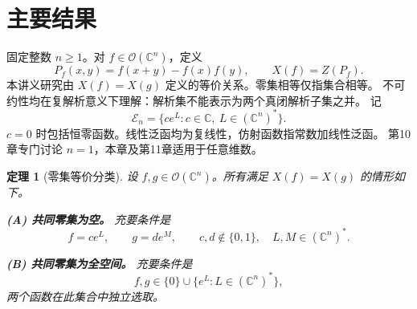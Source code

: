 \documentclass[11pt,a4paper,oneside,openany]{book}
\theoremstyle{lecture}
\newtheorem{theorem}{定理}[section]
\newcommand{\C}{\mathbb C}
\newcommand{\OO}{\mathcal O}
\newcommand{\En}{\mathcal E_n}
\numberwithin{equation}{section}
\begin{document}
\section{主要结果}\label{an:sec:classification}
固定整数 $n\ge1$。对 $f\in\OO(\C^n)$，定义
\[
 P_f(x,y)=f(x+y)-f(x)f(y),\qquad X(f)=Z(P_f).
\]
本讲义研究由 $X(f)=X(g)$ 定义的等价关系。零集相等仅指集合相等。
不可约性均在复解析意义下理解：解析集不能表示为两个真闭解析子集之并。
记
\[
 \En=\{ce^L:c\in\C,\ L\in(\C^n)^*\}.
\]
$c=0$ 时包括恒零函数。线性泛函均为复线性，仿射函数指常数加线性泛函。
第10章专门讨论 $n=1$，本章及第11章适用于任意维数。

\begin{theorem}[零集等价分类]\label{an:thm:main}
设 $f,g\in\OO(\C^n)$。所有满足 $X(f)=X(g)$ 的情形如下。

\textbf{(A) 共同零集为空。} 充要条件是
\begin{equation}\label{an:eq:emptyclass}
 f=ce^L,\qquad g=de^M,\qquad c,d\notin\{0,1\},
 \quad L,M\in(\C^n)^*.
\end{equation}

\textbf{(B) 共同零集为全空间。} 充要条件是
\begin{equation}\label{an:eq:fullclass}
 f,g\in\{0\}\cup\{e^L:L\in(\C^n)^*\},
\end{equation}
两个函数在此集合中独立选取。


\end{theorem}
\end{document}
